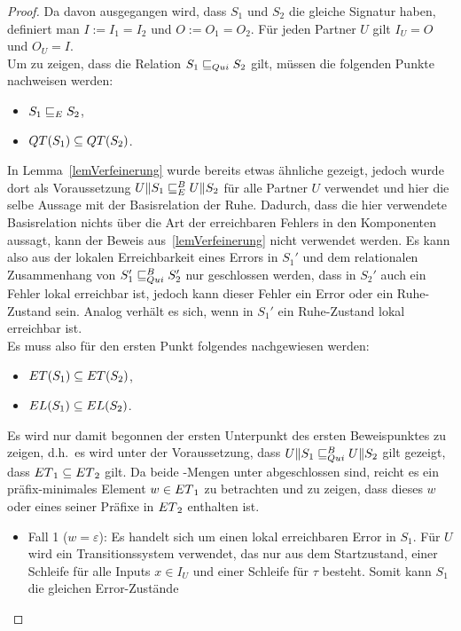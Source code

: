 \begin{proof}
  Da davon ausgegangen wird, dass $S_1$ und $S_2$ die gleiche Signatur haben,
  definiert man $I:=I_1=I_2$ und $O:=O_1=O_2$. Für jeden Partner $U$ gilt
  $I_U=O$ und $O_U=I$.\\
  Um zu zeigen, dass die Relation $S_1\sqsubseteq _{Qui} S_2$ gilt, müssen die
  folgenden Punkte nachweisen werden:
  \begin{itemize}
    \item $S_1\sqsubseteq _E S_2$,
    \item $QT{}(S_1)\subseteq QT{}(S_2)$.
  \end{itemize}
  In Lemma~\ref{lemVerfeinerung} wurde bereits etwas ähnliche gezeigt, jedoch
  wurde dort als Voraussetzung $U\|S_1\sqsubseteq _E^B U\|S_2$ für alle Partner $U$
  verwendet und hier die selbe Aussage mit der Basisrelation der Ruhe. Dadurch,
  dass die hier verwendete Basisrelation nichts über die Art der erreichbaren
  Fehlers in den Komponenten aussagt, kann der Beweis aus~\ref{lemVerfeinerung}
  nicht verwendet werden. Es kann also aus der lokalen Erreichbarkeit eines
  Errors in $S_1'$ und dem relationalen Zusammenhang von $S_1'\sqsubseteq _{Qui}^B S_2'$ nur
  geschlossen werden, dass in $S_2'$ auch ein Fehler lokal erreichbar ist,
  jedoch kann dieser Fehler ein Error oder ein Ruhe-Zustand sein. Analog
  verhält es sich, wenn in $S_1'$ ein Ruhe-Zustand lokal erreichbar ist.\\
  Es muss also für den ersten Punkt folgendes nachgewiesen werden:
  \begin{itemize}
    \item $ET{}(S_1)\subseteq ET{}(S_2)$,
    \item $EL{}(S_1)\subseteq EL{}(S_2)$.
  \end{itemize}
  Es wird nur damit begonnen der ersten Unterpunkt des ersten Beweispunktes zu
  zeigen, d.h.\ es wird unter der Voraussetzung, dass $U\|S_1\sqsubseteq _{Qui}^B U\|S_2$
  gilt gezeigt, dass $ET{}_1\subseteq ET{}_2$ gilt. Da beide \ET{}-Mengen
  unter \cont{} abgeschlossen sind, reicht es ein präfix-minimales Element
  $w\in ET{}_1$ zu betrachten und zu zeigen, dass dieses $w$ oder eines seiner
  Präfixe in $ET{}_2$ enthalten ist.
  \begin{itemize}
    \item Fall 1 ($w=\varepsilon$): Es handelt sich um einen lokal erreichbaren
      Error in $S_1$. Für $U$ wird ein Transitionssystem verwendet, das nur aus
      dem Startzustand, einer Schleife für alle Inputs $x\in I_U$ und einer
      Schleife für $\tau$ besteht. Somit kann $S_1$ die gleichen Error-Zustände

\end{itemize}
\end{proof}
